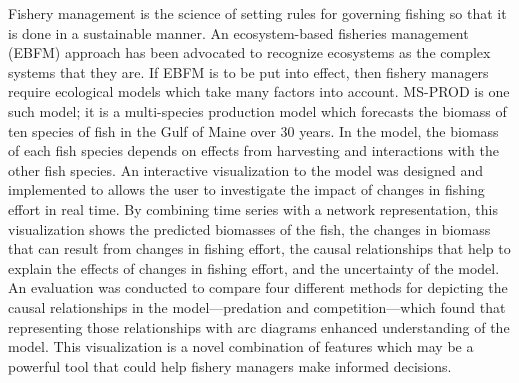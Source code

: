 \begin{abstractpage} 

Fishery management is the science of setting rules for governing fishing so that it is done in a sustainable manner.  An ecosystem-based fisheries management (EBFM) approach has been advocated to recognize ecosystems as the complex systems that they are.  If EBFM is to be put into effect, then fishery managers require ecological models which take many factors into account. MS-PROD is one such model; it is a multi-species production model which forecasts the biomass of ten species of fish in the Gulf of Maine over 30 years.  In the model, the biomass of each fish species depends on effects from harvesting and interactions with the other fish species.  An interactive visualization to the model was designed and implemented to allows the user to investigate the impact of changes in fishing effort in real time.  By combining time series with a network representation, this visualization shows the predicted biomasses of the fish, the changes in biomass that can result from changes in fishing effort, the causal relationships that help to explain the effects of changes in fishing effort, and the uncertainty of the model.  An evaluation was conducted to compare four different methods for depicting the causal relationships in the model---predation and competition---which found that representing those relationships with arc diagrams enhanced understanding of the model.  This visualization is a novel combination of features which may be a powerful tool that could help fishery managers make informed decisions.

\end{abstractpage}